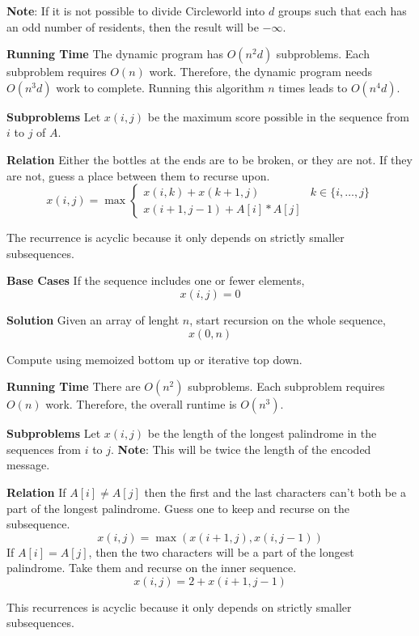 \documentclass[12pt,twoside]{article}
\begin{document}
\begin{problems}
{\bf Note}: If it is not possible to divide Circleworld into $d$ groups such
that each has an odd number of residents, then the result will be $-\infty$.

{\bf Running Time} The dynamic program has $O(n^2d)$ subproblems. Each
subproblem requires $O(n)$ work. Therefore, the dynamic program needs $O(n^3
d)$ work to complete. Running this algorithm $n$ times leads to $O(n^4 d)$.

\newpage
\problem  %
{\bf Subproblems} Let $x(i, j)$ be the maximum score possible in the sequence
from $i$ to $j$ of $A$.

{\bf Relation} Either the bottles at the ends are to be broken, or they are
not. If they are not, guess a place between them to recurse upon.
$$ x(i, j) = \max\begin{cases}
  x(i, k) + x(k + 1, j) & k \in \{i, \ldots, j\} \\
  x(i + 1, j - 1) + A[i] * A[j] 
\end{cases} $$

The recurrence is acyclic because it only depends on strictly smaller
subsequences.

{\bf Base Cases} If the sequence includes one or fewer elements,
$$ x(i, j) = 0 $$

{\bf Solution} Given an array of lenght $n$, start recursion on the whole
sequence,
$$ x(0, n) $$

Compute using memoized bottom up or iterative top down.

{\bf Running Time} There are $O(n^2)$ subproblems. Each subproblem requires
$O(n)$ work. Therefore, the overall runtime is $O(n^3)$.

\newpage
\problem  %

\begin{problemparts}
\problempart %
{\bf Subproblems} Let $x(i, j)$ be the length of the longest palindrome in
the sequences from $i$ to $j$. {\bf Note}: This will be twice the length of
the encoded message.

{\bf Relation} If $A[i] \neq A[j]$ then the first and the last characters
can't both be a part of the longest palindrome. Guess one to keep and
recurse on the subsequence.
$$ x(i, j) = \max(x(i + 1, j), x(i, j - 1)) $$
If $A[i] = A[j]$, then the two characters will be a part of the longest
palindrome. Take them and recurse on the inner sequence.
$$ x(i, j) = 2 + x(i + 1, j - 1) $$

This recurrences is acyclic because it only depends on strictly smaller
subsequences.


\end{problemparts}
\end{problems}
\end{document}
